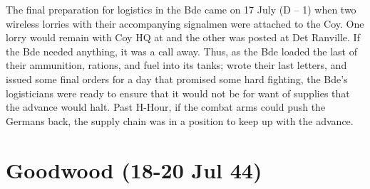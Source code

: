 \documentclass[noraggedright]{turabian-researchpaper}
\begin{document}
The final preparation for logistics in the Bde came on 17 July (D -- 1) when
two wireless lorries with their accompanying signalmen were attached to the 
Coy. One lorry would remain with Coy HQ at %
and the other was posted at Det Ranville.\autocite[Regarding Signals, 17 July 
1944; regarding location of HQ, 5 July 1944]{90wd}
If the Bde needed anything, it was a call away.  Thus, as the Bde loaded the 
last of their ammunition, rations, and fuel into its tanks; wrote their last 
letters, and issued some final orders for a day that promised some hard 
fighting, the Bde's logisticians were ready to ensure that it would not be 
for want of supplies that the advance would halt.  Past H-Hour, if the combat 
arms could push the Germans back, the supply chain was in a position to keep 
up with the advance.









\section{Goodwood (18-20 Jul 44)}
\end{document}
